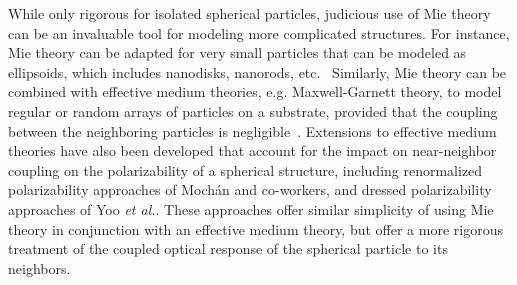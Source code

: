 \documentclass[10pt,letterpaper]{article}
\begin{document}
While only rigorous for 
isolated spherical particles, judicious use of Mie theory can be an invaluable tool for modeling more complicated structures.  For instance, Mie theory can 
be adapted for very small particles that can be modeled as ellipsoids, which includes nanodisks, 
nanorods, etc.~\cite{Bohren}  Similarly, Mie theory 
can be combined with effective medium theories, e.g. Maxwell-Garnett theory, to model 
regular or random arrays of particles on a substrate, provided that the coupling 
between the neighboring particles is negligible~\cite{Bohren}.  
Extensions to effective medium theories have also
been developed that account for the impact on near-neighbor coupling on the 
polarizability of a spherical structure, 
including renormalized polarizability approaches of Moch\'{a}n and co-workers\cite{BCM_PRB_1988,BMM_PRB_1991}, and dressed
polarizability approaches of Yoo {\it et al.}\cite{YP_OptExpress_2012}.  These approaches offer similar simplicity of
using Mie theory in conjunction with an effective medium theory, but offer a more rigorous treatment of the coupled
optical response of the spherical particle to its neighbors.  
\end{document}
